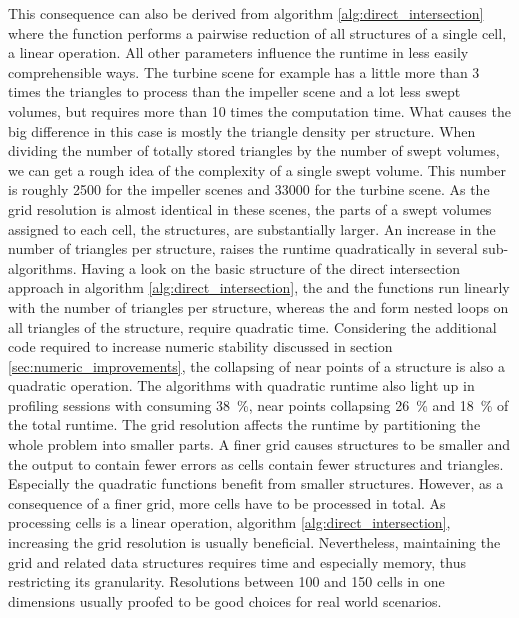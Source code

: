 This consequence can also be derived from algorithm \ref{alg:direct_intersection} where the  function performs a pairwise reduction of all structures of a single cell, a linear operation.
All other parameters influence the runtime in less easily comprehensible ways.
The turbine scene for example has a little more than 3 times the triangles to process than the impeller scene and a lot less swept volumes, but requires more than 10 times the computation time.
What causes the big difference in this case is mostly the triangle density per structure.
When dividing the number of totally stored triangles by the number of swept volumes, we can get a rough idea of the complexity of a single swept volume.
This number is roughly 2500 for the impeller scenes and 33000 for the turbine scene.
As the grid resolution is almost identical in these scenes, the parts of a swept volumes assigned to each cell, \ie the structures, are substantially larger.
An increase in the number of triangles per structure, raises the runtime quadratically in several sub-algorithms.
Having a look on the basic structure of the direct intersection approach in algorithm \ref{alg:direct_intersection}, the  and the  functions run linearly with the number of triangles per structure, whereas the  and  form nested loops on all triangles of the structure, \ie require quadratic time.
Considering the additional code required to increase numeric stability discussed in section \ref{sec:numeric_improvements}, the collapsing of near points of a structure is also a quadratic operation.
The algorithms with quadratic runtime also light up in profiling sessions with  consuming \SI{38}{\percent}, near points collapsing \SI{26}{\percent} and  \SI{18}{\percent} of the total runtime.
The grid resolution affects the runtime by partitioning the whole problem into smaller parts.
A finer grid causes structures to be smaller and the output to contain fewer errors as cells contain fewer structures and triangles.
Especially the quadratic functions benefit from smaller structures.
However, as a consequence of a finer grid, more cells have to be processed in total.
As processing cells is a linear operation, \cf algorithm \ref{alg:direct_intersection}, increasing the grid resolution is usually beneficial.
Nevertheless, maintaining the grid and related data structures requires time and especially memory, thus restricting its granularity.
Resolutions between 100 and 150 cells in one dimensions usually proofed to be good choices for real world scenarios.

